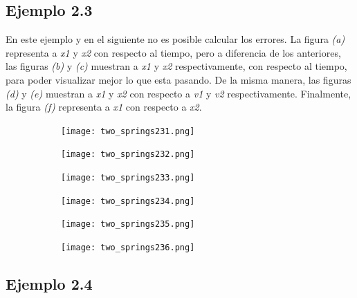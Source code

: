 \documentclass{article}
\begin{document}
\vspace{6.5cm}

\subsection*{Ejemplo 2.3}

En este ejemplo y en el siguiente no es posible calcular los errores. La figura \textit{(a)} representa a \textit{x1} y \textit{x2} con respecto al tiempo, pero a diferencia de los anteriores, las figuras \textit{(b)} y \textit{(c)} muestran a \textit{x1} y \textit{x2} respectivamente, con respecto al tiempo, para poder visualizar mejor lo que esta pasando. De la misma manera, las figuras \textit{(d)} y \textit{(e)} muestran a \textit{x1} y \textit{x2} con respecto a \textit{v1} y \textit{v2} respectivamente. Finalmente, la figura \textit{(f)} representa a \textit{x1} con respecto a \textit{x2}.

\begin{figure}[h!]
  \centering
  \begin{subfigure}[b]{0.32\linewidth}
    \texttt{[image: two\_springs231.png]}
     \caption{}
  \end{subfigure}
  \begin{subfigure}[b]{0.32\linewidth}
    \texttt{[image: two\_springs232.png]}
    \caption{}
  \end{subfigure}
  \begin{subfigure}[b]{0.32\linewidth}
    \texttt{[image: two\_springs233.png]}
    \caption{}
  \end{subfigure}
  \begin{subfigure}[b]{0.45\linewidth}
    \texttt{[image: two\_springs234.png]}
    \caption{}
  \end{subfigure}
  \begin{subfigure}[b]{0.45\linewidth}
    \texttt{[image: two\_springs235.png]}
    \caption{}
  \end{subfigure}
  \begin{subfigure}[b]{0.5\linewidth}
    \texttt{[image: two\_springs236.png]}
    \caption{}
  \end{subfigure}
\end{figure}

\vspace{1.5cm}

\subsection*{Ejemplo 2.4}
\end{document}
